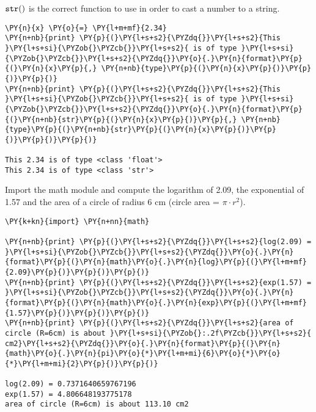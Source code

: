 \begin{Answer}
\(\tt{str()}\) is the correct function to use in order to cast a number
to a string.

\begin{tcolorbox}[size=fbox, boxrule=1pt, colback=cellbackground, colframe=cellborder]
\begin{Verbatim}[commandchars=\\\{\}]
\PY{n}{x} \PY{o}{=} \PY{l+m+mf}{2.34}
\PY{n+nb}{print} \PY{p}{(}\PY{l+s+s2}{\PYZdq{}}\PY{l+s+s2}{This }\PY{l+s+si}{\PYZob{}\PYZcb{}}\PY{l+s+s2}{ is of type }\PY{l+s+si}{\PYZob{}\PYZcb{}}\PY{l+s+s2}{\PYZdq{}}\PY{o}{.}\PY{n}{format}\PY{p}{(}\PY{n}{x}\PY{p}{,} \PY{n+nb}{type}\PY{p}{(}\PY{n}{x}\PY{p}{)}\PY{p}{)}\PY{p}{)}
\PY{n+nb}{print} \PY{p}{(}\PY{l+s+s2}{\PYZdq{}}\PY{l+s+s2}{This }\PY{l+s+si}{\PYZob{}\PYZcb{}}\PY{l+s+s2}{ is of type }\PY{l+s+si}{\PYZob{}\PYZcb{}}\PY{l+s+s2}{\PYZdq{}}\PY{o}{.}\PY{n}{format}\PY{p}{(}\PY{n+nb}{str}\PY{p}{(}\PY{n}{x}\PY{p}{)}\PY{p}{,} \PY{n+nb}{type}\PY{p}{(}\PY{n+nb}{str}\PY{p}{(}\PY{n}{x}\PY{p}{)}\PY{p}{)}\PY{p}{)}\PY{p}{)}

This 2.34 is of type <class 'float'>
This 2.34 is of type <class 'str'>
\end{Verbatim}
\end{tcolorbox}  
\end{Answer}

\begin{Exercise}
Import the math module and compute the logarithm of 2.09, the exponential of 1.57 and the area of a circle of radius 6 cm (circle area = $\pi \cdot r^2$).
\end{Exercise}

\begin{Answer}
\begin{tcolorbox}[size=fbox, boxrule=1pt, colback=cellbackground, colframe=cellborder]
\begin{Verbatim}[commandchars=\\\{\}]
\PY{k+kn}{import} \PY{n+nn}{math}

\PY{n+nb}{print} \PY{p}{(}\PY{l+s+s2}{\PYZdq{}}\PY{l+s+s2}{log(2.09) = }\PY{l+s+si}{\PYZob{}\PYZcb{}}\PY{l+s+s2}{\PYZdq{}}\PY{o}{.}\PY{n}{format}\PY{p}{(}\PY{n}{math}\PY{o}{.}\PY{n}{log}\PY{p}{(}\PY{l+m+mf}{2.09}\PY{p}{)}\PY{p}{)}\PY{p}{)}
\PY{n+nb}{print} \PY{p}{(}\PY{l+s+s2}{\PYZdq{}}\PY{l+s+s2}{exp(1.57) = }\PY{l+s+si}{\PYZob{}\PYZcb{}}\PY{l+s+s2}{\PYZdq{}}\PY{o}{.}\PY{n}{format}\PY{p}{(}\PY{n}{math}\PY{o}{.}\PY{n}{exp}\PY{p}{(}\PY{l+m+mf}{1.57}\PY{p}{)}\PY{p}{)}\PY{p}{)}
\PY{n+nb}{print} \PY{p}{(}\PY{l+s+s2}{\PYZdq{}}\PY{l+s+s2}{area of circle (R=6cm) is about }\PY{l+s+si}{\PYZob{}:.2f\PYZcb{}}\PY{l+s+s2}{ cm2}\PY{l+s+s2}{\PYZdq{}}\PY{o}{.}\PY{n}{format}\PY{p}{(}\PY{n}{math}\PY{o}{.}\PY{n}{pi}\PY{o}{*}\PY{l+m+mi}{6}\PY{o}{*}\PY{o}{*}\PY{l+m+mi}{2}\PY{p}{)}\PY{p}{)}

log(2.09) = 0.7371640659767196
exp(1.57) = 4.806648193775178
area of circle (R=6cm) is about 113.10 cm2
\end{Verbatim}
\end{tcolorbox}
\end{Answer}

